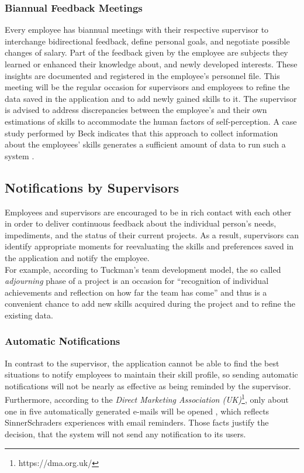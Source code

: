 \subsubsection{Biannual Feedback Meetings}
Every employee has biannual meetings with their respective supervisor to interchange
bidirectional feedback, define personal goals, and negotiate possible changes of salary.
Part of the feedback given by the employee are subjects they learned or enhanced their knowledge about, and newly developed interests. These insights are documented and registered in the employee's personnel file.
This meeting will be the regular occasion for supervisors and employees to refine the data saved in the application and to add
newly gained skills to it. The supervisor is advised to address discrepancies between the employee's and their own estimations of skills to accommodate the human factors of self-perception. A case study performed by Beck indicates that this approach to
collect information about the employees' skills generates a sufficient amount of data to run such a system \cite{beck}.

\subsection{Notifications by Supervisors}
Employees and supervisors are encouraged to be in rich contact with each other in order to deliver continuous feedback
about the individual person's needs, impediments, and the status of their current projects.
As a result, supervisors can identify appropriate moments for reevaluating the skills and preferences saved in the application and notify the employee.\\
For example, according to Tuckman's team development model, the so called \textit{adjourning} phase of a project is an occasion for ``recognition of individual achievements and reflection on how far the team has come'' \cite[P. 3]{Wilson} and thus is a convenient chance to add new skills acquired during the project and to refine the existing data.

\subsubsection{Automatic Notifications}
In contrast to the supervisor, the application cannot be able to find the best situations to notify employees to maintain their skill profile, so sending automatic notifications will not be nearly as effective as being reminded by the supervisor. Furthermore, according to the \textit{Direct Marketing Association (UK)}\footnote{https://dma.org.uk/}, only
about one in five automatically generated e-mails will be opened \cite{mailrep}, which reflects SinnerSchraders
experiences with email reminders. Those facts justify the decision, that the system will not send any notification to its users.

